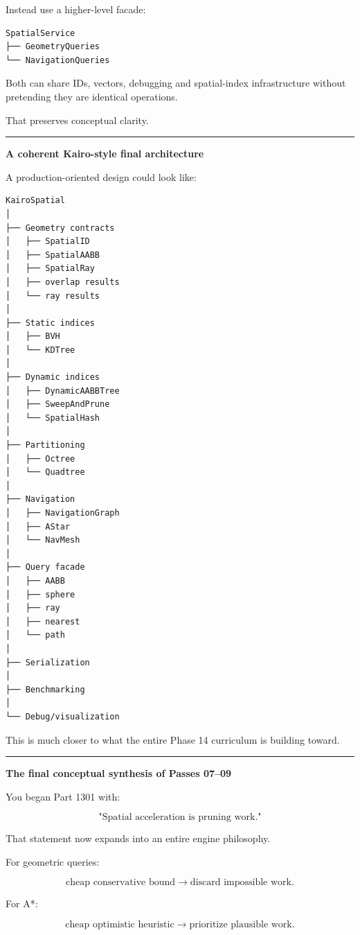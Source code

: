 Instead use a higher-level facade:

\begin{verbatim}
SpatialService
├── GeometryQueries
└── NavigationQueries
\end{verbatim}

Both can share IDs, vectors, debugging and spatial-index infrastructure without pretending they are identical operations.

That preserves conceptual clarity.

\begin{center}\rule{0.5\linewidth}{0.5pt}\end{center}

\textbf{A coherent Kairo-style final architecture}

A production-oriented design could look like:

\begin{verbatim}
KairoSpatial
│
├── Geometry contracts
│   ├── SpatialID
│   ├── SpatialAABB
│   ├── SpatialRay
│   ├── overlap results
│   └── ray results
│
├── Static indices
│   ├── BVH
│   └── KDTree
│
├── Dynamic indices
│   ├── DynamicAABBTree
│   ├── SweepAndPrune
│   └── SpatialHash
│
├── Partitioning
│   ├── Octree
│   └── Quadtree
│
├── Navigation
│   ├── NavigationGraph
│   ├── AStar
│   └── NavMesh
│
├── Query facade
│   ├── AABB
│   ├── sphere
│   ├── ray
│   ├── nearest
│   └── path
│
├── Serialization
│
├── Benchmarking
│
└── Debug/visualization
\end{verbatim}

This is much closer to what the entire Phase 14 curriculum is building toward.

\begin{center}\rule{0.5\linewidth}{0.5pt}\end{center}

\textbf{The final conceptual synthesis of Passes 07--09}

You began Part 1301 with:

\[
\text{"Spatial acceleration is pruning work."}
\]

That statement now expands into an entire engine philosophy.

For geometric queries:

\[
\text{cheap conservative bound}
\rightarrow
\text{discard impossible work}.
\]

For A*:

\[
\text{cheap optimistic heuristic}
\rightarrow
\text{prioritize plausible work}.
\]

